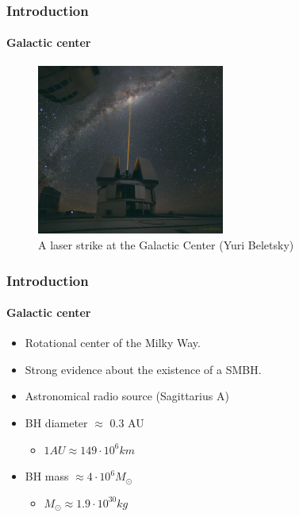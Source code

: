 \begin{frame}
    \frametitle{Introduction}
    \framesubtitle{Galactic center}
    \begin{figure}
        \centering
        \includegraphics[width=0.55\textwidth]{img/galactic-center}
        \caption{A laser strike at the Galactic Center (Yuri Beletsky)}
        \label{fig:galactic-center}
    \end{figure}
\end{frame}

\begin{frame}
    \frametitle{Introduction}
    \framesubtitle{Galactic center}
    \begin{itemize}
        \item Rotational center of the Milky Way.
        \item Strong evidence about the existence of a SMBH.
            \item Astronomical radio source (Sagittarius A)
            \item BH diameter $\approx$ 0.3 AU
            \begin{itemize}
                \item $1 AU \approx 149\cdot10^{6} km$ 
            \end{itemize}
            \item BH mass $\approx 4\cdot 10^{6} M_{\odot}$
            \begin{itemize}
                \item $M_{\odot} \approx 1.9\cdot 10^{30} kg$
            \end{itemize}
    \end{itemize}
\end{frame}

